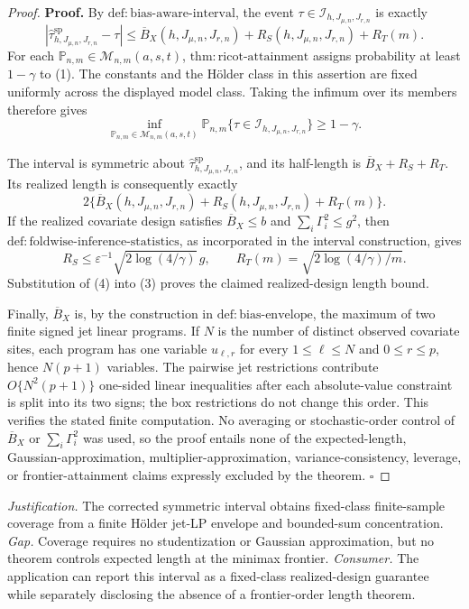 \documentclass{article}
\begin{document}
\begin{proof}
\textbf{Proof.}
By \(\mathrm{def:bias\text{-}aware\text{-}interval}\), the event
\(\tau\in\mathcal I_{h,J_{\mu,n},J_{r,n}}\) is exactly
\[
\left|\widehat\tau^{\mathrm{sp}}_{h,J_{\mu,n},J_{r,n}}-\tau\right|
\le\overline B_X(h,J_{\mu,n},J_{r,n})
+R_S(h,J_{\mu,n},J_{r,n})+R_T(m).
\tag{1}
\]
For each \(\mathbb P_{n,m}\in\mathcal M_{n,m}(a,s,t)\),
\(\mathrm{thm:ricot\text{-}attainment}\) assigns probability at least
\(1-\gamma\) to (1).  The constants and the H\"older class in this assertion are
fixed uniformly across the displayed model class.  Taking the infimum over its
members therefore gives
\[
\inf_{\mathbb P_{n,m}\in\mathcal M_{n,m}(a,s,t)}
\mathbb P_{n,m}\{\tau\in\mathcal I_{h,J_{\mu,n},J_{r,n}}\}
\ge1-\gamma.
\tag{2}
\]

The interval is symmetric about
\(\widehat\tau^{\mathrm{sp}}_{h,J_{\mu,n},J_{r,n}}\), and its half-length is
\(\overline B_X+R_S+R_T\).  Its realized length is consequently exactly
\[
2\{\overline B_X(h,J_{\mu,n},J_{r,n})
+R_S(h,J_{\mu,n},J_{r,n})+R_T(m)\}.
\tag{3}
\]
If the realized covariate design satisfies \(\overline B_X\le b\) and
\(\sum_i\Gamma_i^2\le g^2\), then
\(\mathrm{def:foldwise\text{-}inference\text{-}statistics}\), as incorporated in
the interval construction, gives
\[
R_S\le\varepsilon^{-1}\sqrt{2\log(4/\gamma)}\,g,
\qquad
R_T(m)=\sqrt{2\log(4/\gamma)/m}.
\tag{4}
\]
Substitution of (4) into (3) proves the claimed realized-design length bound.

Finally, \(\overline B_X\) is, by the construction in
\(\mathrm{def:bias\text{-}envelope}\), the maximum of two finite signed jet linear
programs.  If \(N\) is the number of distinct observed covariate sites, each program
has one variable \(u_{\ell,r}\) for every
\(1\le\ell\le N\) and \(0\le r\le p\), hence \(N(p+1)\) variables.  The pairwise
jet restrictions contribute \(O\{N^2(p+1)\}\) one-sided linear inequalities after
each absolute-value constraint is split into its two signs; the box restrictions
do not change this order.  This verifies the stated finite computation.  No
averaging or stochastic-order control of \(\overline B_X\) or
\(\sum_i\Gamma_i^2\) was used, so the proof entails none of the expected-length,
Gaussian-approximation, multiplier-approximation, variance-consistency, leverage,
or frontier-attainment claims expressly excluded by the theorem.
\(\square\)
\end{proof}
\par\smallskip\noindent \textit{Justification.} The corrected symmetric interval obtains fixed-class finite-sample coverage from a finite Hölder jet-LP envelope and bounded-sum concentration. \textit{Gap.} Coverage requires no studentization or Gaussian approximation, but no theorem controls expected length at the minimax frontier. \textit{Consumer.} The application can report this interval as a fixed-class realized-design guarantee while separately disclosing the absence of a frontier-order length theorem.
\end{document}
